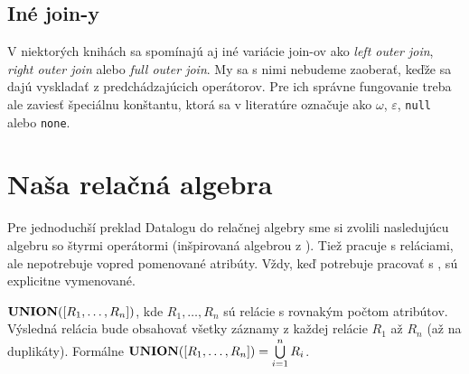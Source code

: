 \subsection*{\textbf{Iné join-y}} V niektorých knihách sa spomínajú aj iné variácie join-ov ako
\textit{left outer join}, \textit{right outer join} alebo \textit{full outer join}. My sa s nimi
nebudeme zaoberať, keďže sa dajú vyskladať z predchádzajúcich operátorov. Pre ich správne fungovanie
treba ale zaviesť špeciálnu konštantu, ktorá sa v literatúre označuje ako $\omega$, $\varepsilon$,
\verb|null| alebo \verb|none|.

\section{Naša relačná algebra}
Pre jednoduchší preklad Datalogu do relačnej algebry sme si zvolili nasledujúcu algebru so štyrmi
operátormi (inšpirovaná algebrou z \cite{RAcompilator}). Tiež pracuje s reláciami, ale nepotrebuje
vopred pomenované atribúty. Vždy, keď potrebuje pracovať s , sú explicitne
vymenované.

\vline

$\textbf{UNION}([R_1, \dots, R_n])$, kde $R_1, \dots, R_n$ sú relácie s rovnakým počtom atribútov. Výsledná
relácia bude obsahovať všetky záznamy z každej relácie $R_1$ až $R_n$ (až na duplikáty). Formálne
$\textbf{UNION}([R_1, \dots, R_n]) = \bigcup\limits_{i=1}^n R_i$.

